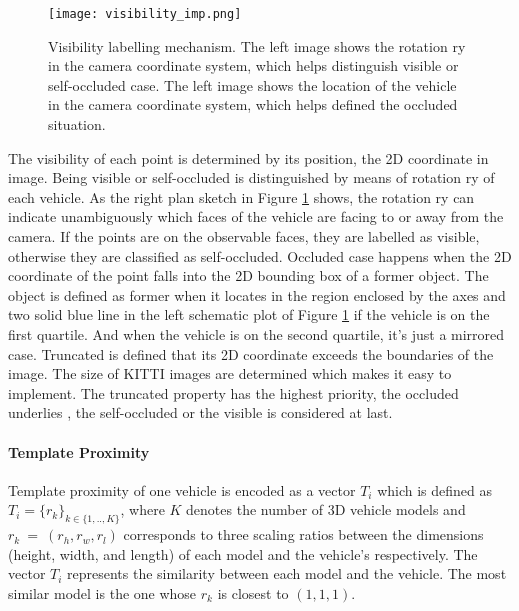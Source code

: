 \begin{figure}[h]		
	\texttt{[image: visibility\_imp.png]}
	\caption{Visibility labelling mechanism. The left image shows the rotation ry in the camera coordinate system, which helps distinguish visible or self-occluded case. The left image shows the location of the vehicle in the camera coordinate system, which helps defined the occluded situation.}
	\centering
	\label{visibility_imp}
\end{figure}

The visibility of each point is determined by its position, \ie the 2D coordinate in image.  Being visible or self-occluded is distinguished by means of rotation ry of each vehicle. As the right plan sketch in Figure \ref{visibility_imp} shows, the rotation ry can indicate unambiguously which faces of the vehicle are facing to or away from the camera. If the points are on the observable faces, they  are labelled as visible,  otherwise they are classified as self-occluded. Occluded case happens when the 2D coordinate of the point falls into the 2D bounding box of a former object. The object is defined as former when it locates in the region enclosed by the axes and two solid blue line in the left schematic plot of Figure \ref{visibility_imp} if the vehicle is on the first quartile.  And when the vehicle is on the second quartile, it's just a mirrored case. Truncated is defined that its 2D coordinate exceeds the boundaries of the image. The size of KITTI images are determined which makes it easy to implement. The truncated property has the highest priority, the occluded underlies , the self-occluded or the visible is considered at last.


\paragraph{Template Proximity}
\label{template}

Template proximity of one vehicle is encoded as a vector $\mathit{T_{i}}$ which is defined as $\mathit{T}_i = \{r_k\}_{k \in \{1,.., K\}}$, where $\mathit{K}$ denotes the number of 3D vehicle models and  $r_k~=~(r_h,r_w,r_l)$ corresponds to three scaling ratios between the dimensions (\ie height, width, and length) of each model and the vehicle's respectively. The vector $\mathit{T_{i}}$ represents the similarity between each model and the vehicle. The most similar model is the one whose $r_k$ is closest to $(1, 1, 1)$.

